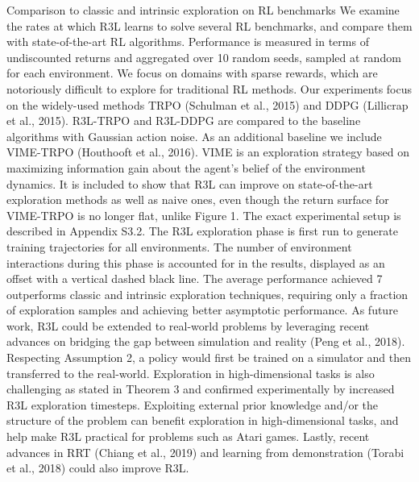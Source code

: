 \documentclass{article}
\newcounter{n}
\begin{document}
Comparison to classic and intrinsic exploration on RL benchmarks We examine the rates at
which R3L learns to solve several RL benchmarks, and compare them with state-of-the-art RL
algorithms. Performance is measured in terms of undiscounted returns and aggregated over 10
random seeds, sampled at random for each environment. We focus on domains with sparse rewards,
which are notoriously difficult to explore for traditional RL methods. Our experiments focus on the
widely-used methods TRPO (Schulman et al., 2015) and DDPG (Lillicrap et al., 2015). R3L-TRPO
and R3L-DDPG are compared to the baseline algorithms with Gaussian action noise. As an additional
baseline we include VIME-TRPO (Houthooft et al., 2016). VIME is an exploration strategy based on
maximizing information gain about the agent’s belief of the environment dynamics. It is included to
show that R3L can improve on state-of-the-art exploration methods as well as naive ones, even though
the return surface for VIME-TRPO is no longer flat, unlike Figure 1. The exact experimental setup is
described in Appendix S3.2. The R3L exploration phase is first run to generate training trajectories
for all environments. The number of environment interactions during this phase is accounted for in
the results, displayed as an offset with a vertical dashed black line. The average performance achieved
7
outperforms classic and intrinsic exploration techniques, requiring only a fraction of exploration
samples and achieving better asymptotic performance.
As future work, R3L could be extended to real-world problems by leveraging recent advances on
bridging the gap between simulation and reality (Peng et al., 2018). Respecting Assumption 2, a
policy would first be trained on a simulator and then transferred to the real-world. Exploration in
high-dimensional tasks is also challenging as stated in Theorem 3 and confirmed experimentally
by increased R3L exploration timesteps. Exploiting external prior knowledge and/or the structure
of the problem can benefit exploration in high-dimensional tasks, and help make R3L practical for
problems such as Atari games. Lastly, recent advances in RRT (Chiang et al., 2019) and learning
from demonstration (Torabi et al., 2018) could also improve R3L.
\end{document}
